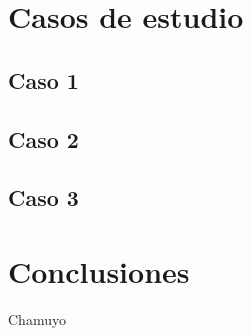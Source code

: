 \documentclass[a4paper,10pt]{article}
\begin{document}
\section{Casos de estudio}
	\subsection{Caso 1}
	\subsection{Caso 2}
	\subsection{Caso 3}
	
\section{Conclusiones}
Chamuyo

\begin{comment}
\begin{thebibliography}{99}

\bibitem{INT06} Intel Technology \& Research, ``Hyper-Threading Technology,'' 2006, http://www.intel.com/technology/hyperthread/.

\bibitem{HEN00} J. L. Hennessy and D. A. Patterson, ``Computer Architecture. A Quantitative
Approach,'' 3ra Edición, Morgan Kaufmann Publishers, 2000.

\bibitem{LAR92} J. Larus and T. Ball, ``Rewriting Executable Files to Mesure Program Behavior,'' Tech. Report 1083, Univ. of Wisconsin, 1992.

\end{thebibliography}
\end{comment}
\end{document}
